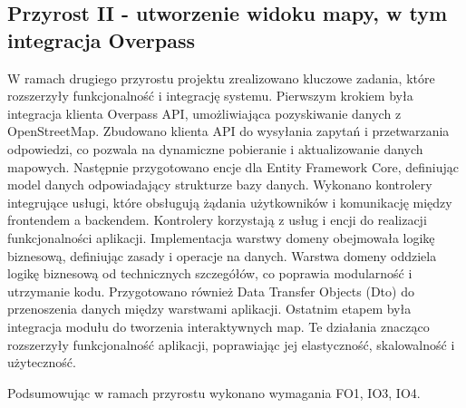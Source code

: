 \subsection{Przyrost II - utworzenie widoku mapy, w tym integracja  Overpass}
    \label{sec:przyrost2}

    W ramach drugiego przyrostu projektu zrealizowano kluczowe zadania, które rozszerzyły funkcjonalność i integrację systemu. \newline
    \indent Pierwszym krokiem była integracja klienta Overpass API, umożliwiająca pozyskiwanie danych z OpenStreetMap. Zbudowano klienta API do wysyłania zapytań i przetwarzania odpowiedzi, co pozwala na dynamiczne pobieranie i aktualizowanie danych mapowych.\newline
    \indent Następnie przygotowano encje dla Entity Framework Core, definiując model danych odpowiadający strukturze bazy danych.
    Wykonano kontrolery integrujące usługi, które obsługują żądania użytkowników i komunikację między frontendem a backendem. Kontrolery korzystają z usług i encji do realizacji funkcjonalności aplikacji.\newline
    \indent Implementacja warstwy domeny obejmowała logikę biznesową, definiując zasady i operacje na danych. Warstwa domeny oddziela logikę biznesową od technicznych szczegółów, co poprawia modularność i utrzymanie kodu.\newline
    \indent Przygotowano również Data Transfer Objects (Dto) do przenoszenia danych między warstwami aplikacji.    \newline
    \indent Ostatnim etapem była integracja modułu   do tworzenia interaktywnych map.\newline
    Te działania znacząco rozszerzyły funkcjonalność aplikacji, poprawiając jej elastyczność, skalowalność i użyteczność.\newline

    Podsumowując w ramach przyrostu wykonano wymagania  FO1, IO3, IO4.

